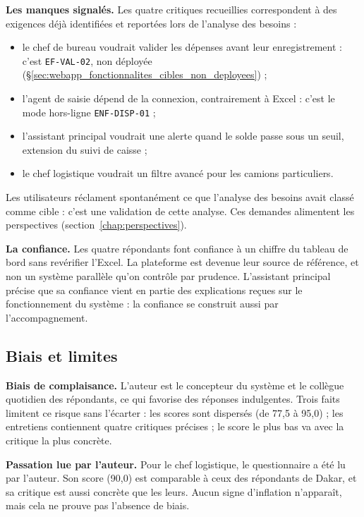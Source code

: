 \textbf{Les manques signalés.} Les quatre critiques recueillies correspondent à des exigences déjà identifiées et reportées lors de l'analyse des besoins :
\begin{itemize}
    \item le chef de bureau voudrait valider les dépenses avant leur enregistrement : c'est \texttt{EF-VAL-02}, non déployée (\S\ref{sec:webapp_fonctionnalites_cibles_non_deployees}) ;
    \item l'agent de saisie dépend de la connexion, contrairement à Excel : c'est le mode hors-ligne \texttt{ENF-DISP-01} ;
    \item l'assistant principal voudrait une alerte quand le solde passe sous un seuil, extension du suivi de caisse ;
    \item le chef logistique voudrait un filtre avancé pour les camions particuliers.
\end{itemize}
Les utilisateurs réclament spontanément ce que l'analyse des besoins avait classé comme cible : c'est une validation de cette analyse. Ces demandes alimentent les perspectives (section~\ref{chap:perspectives}).

\textbf{La confiance.} Les quatre répondants font confiance à un chiffre du tableau de bord sans revérifier l'Excel. La plateforme est devenue leur source de référence, et non un système parallèle qu'on contrôle par prudence. L'assistant principal précise que sa confiance vient en partie des explications reçues sur le fonctionnement du système : la confiance se construit aussi par l'accompagnement.

\subsection{Biais et limites}
\label{sec:adoption_biais}

\textbf{Biais de complaisance.} L'auteur est le concepteur du système et le collègue quotidien des répondants, ce qui favorise des réponses indulgentes. Trois faits limitent ce risque sans l'écarter : les scores sont dispersés (de 77,5 à 95,0) ; les entretiens contiennent quatre critiques précises ; le score le plus bas va avec la critique la plus concrète.

\textbf{Passation lue par l'auteur.} Pour le chef logistique, le questionnaire a été lu par l'auteur. Son score (90,0) est comparable à ceux des répondants de Dakar, et sa critique est aussi concrète que les leurs. Aucun signe d'inflation n'apparaît, mais cela ne prouve pas l'absence de biais.

